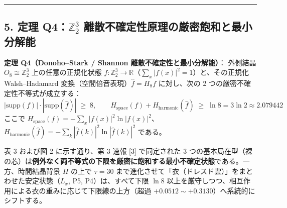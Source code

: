 \documentclass[
  a4paper,
]{ltjsarticle}
\begin{document}
\begin{center}\rule{0.5\linewidth}{0.5pt}\end{center}

\subsection{\texorpdfstring{5. 定理 Q4：\(\mathbb{Z}_2^3\)
離散不確定性原理の厳密飽和と最小分解能}{5. 定理 Q4：\textbackslash mathbb\{Z\}\_2\^{}3 離散不確定性原理の厳密飽和と最小分解能}}\label{ux5b9aux7406-q4mathbbz_23-ux96e2ux6563ux4e0dux78baux5b9aux6027ux539fux7406ux306eux53b3ux5bc6ux98fdux548cux3068ux6700ux5c0fux5206ux89e3ux80fd}

\textbf{定理 Q4（Donoho--Stark / Shannon 離散不確定性と最小分解能）}：
外側結晶 \(O_8 \cong \mathbb{Z}_2^3\) 上の任意の正規化状態
\(f: \mathbb{Z}_2^3 \to \mathbb{R}\)（\(\sum_x |f(x)|^2 = 1\)）と、その正規化
Walsh--Hadamard 変換（空間倍音表現）\(\hat{f} = H_8 f\) に対し、次の 2
つの厳密不確定性不等式が成立する：
\[|\mathrm{supp}(f)| \cdot |\mathrm{supp}(\hat{f})| \;\ge\; 8, \qquad H_{\mathrm{space}}(f) + H_{\mathrm{harmonic}}(\hat{f}) \;\ge\; \ln 8 = 3\ln 2 \approx 2.079442\]
ここで
\(H_{\mathrm{space}}(f) = -\sum_x |f(x)|^2 \ln |f(x)|^2\)、\(H_{\mathrm{harmonic}}(\hat{f}) = -\sum_k |\hat{f}(k)|^2 \ln |\hat{f}(k)|^2\)
である。

表 3 および図 2 に示す通り、第 3 速報 {[}3{]} で同定された 3
つの基本局在型（裸の芯）は\textbf{例外なく両不等式の下限を厳密に飽和する最小不確定状態}である。一方、時間結晶背景
\(H\) の上で \(\tau = 30\)
まで進化させて「衣（ドレスド雲）」をまとわせた安定状態（\(L_x\), P5,
P4）は、すべて下限 \(\ln 8\)
以上を厳守しつつ、相互作用による衣の重みに応じて下限線の上方（超過
\(+0.0512 \sim +0.3130\)）へ系統的にシフトする。
\end{document}
